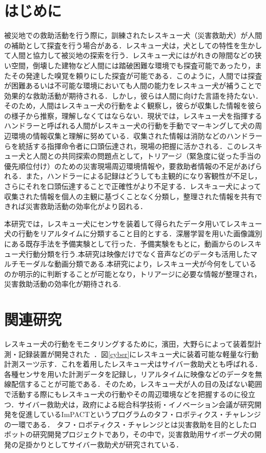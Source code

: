 \chapter{はじめに}
被災地での救助活動を行う際に，訓練されたレスキュー犬（災害救助犬）が人間の補助として探査を行う場合がある．レスキュー犬は，犬としての特性を生かして人間と協力して被災地の探索を行う．レスキュー犬にはがれきの隙間などの狭い空間，倒壊した建物など人間には踏破困難な環境でも探査可能であったり，またその発達した嗅覚を頼りにした探査が可能である．このように，人間では探査が困難あるいは不可能な環境においても人間の能力をレスキュー犬が補うことで効果的な救助活動が期待される．しかし，彼らは人間に向けた言語を持たない．そのため，人間はレスキュー犬の行動をよく観察し，彼らが収集した情報を彼らの様子から推察，理解しなくてはならない．現状では，レスキュー犬を指揮するハンドラーと呼ばれる人間がレスキュー犬の行動を手動でマーキングして犬の周辺環境の情報収集と理解に努めている．収集された情報は消防などのハンドラーらを統括する指揮命令者に口頭伝達され，現場の把握に活かされる．このレスキュー犬と人間との共同探索の問題点として，トリアージ（緊急度に従った手当の優先順位付け）のための災害現場周辺環境情報や，要救助者情報の不足があげられる．また，ハンドラーによる記録はどうしても主観的になり客観性が不足し，さらにそれを口頭伝達することで正確性がより不足する．レスキュー犬によって収集された情報を個人の主観に基づくことなく分類し，整理された情報を共有できれば災害救助活動の効率化がより図れる．

本研究では，レスキュー犬にセンサを装着して得られたデータ用いてレスキュー犬の行動をリアルタイムに分類すること目的とする．深層学習を用いた画像識別にある既存手法を予備実験として行った．予備実験をもとに，動画からのレスキュー犬行動分類を行う.本研究は映像だけでなく音声などのデータも活用したマルチモーダルな動画分類である.本研究により，レスキュー犬が今何をしているのか明示的に判断することが可能となり，トリアージに必要な情報が整理され，災害救助活動の効率化が期待される.

\chapter{関連研究}

レスキュー犬の行動をモニタリングするために，濱田，大野らによって装着型計測・記録装置が開発された~\cite{dog01}．図\ref{cyber}にレスキュー犬に装着可能な軽量な行動計測スーツ示す．これを着用したレスキュー犬はサイバー救助犬とも呼ばれる．各種センサを用いた計測データを記録し，リアルタイムに映像などのデータを無線配信することが可能である．そのため，レスキュー犬が人の目の及ばない範囲で活動する際にもレスキュー犬の行動やその周辺環境などを把握するのに役立つ．サイバー救助犬は，政府による総合科学技術・イノベーション会議が研究開発を促進しているImPACTというプログラムのタフ・ロボティクス・チャレンジの一環である．
タフ・ロボティクス・チャレンジとは災害救助を目的としたロボットの研究開発プロジェクトであり，その中で，災害救助用サイボーグ犬の開発の足掛かりとしてサイバー救助犬が研究されている．

